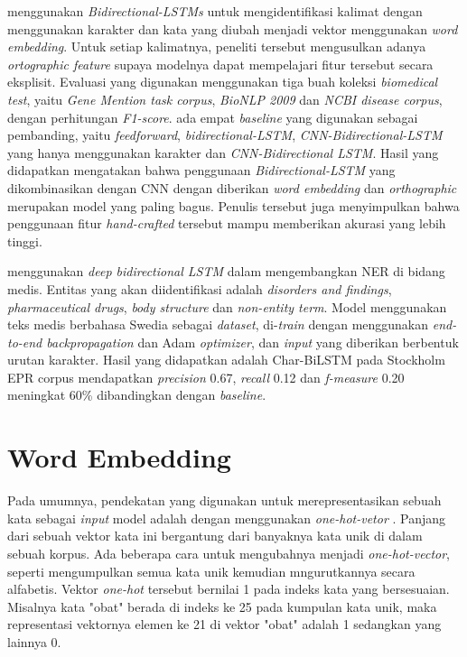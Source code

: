 \cite{limsopatham2016learning} menggunakan \textit{Bidirectional-LSTMs} untuk mengidentifikasi kalimat dengan menggunakan karakter dan kata yang diubah menjadi vektor menggunakan \textit{word embedding}. Untuk setiap kalimatnya, peneliti tersebut mengusulkan adanya \textit{ortographic feature} supaya modelnya dapat mempelajari fitur tersebut secara eksplisit. Evaluasi yang digunakan menggunakan tiga buah koleksi \textit{biomedical test}, yaitu \textit{Gene Mention task corpus}, \textit{BioNLP 2009} dan \textit{NCBI disease corpus}, dengan perhitungan \textit{F1-score}. ada empat \textit{baseline} yang digunakan sebagai pembanding, yaitu \textit{feedforward}, \textit{bidirectional-LSTM}, \textit{CNN-Bidirectional-LSTM} yang hanya menggunakan karakter dan \textit{CNN-Bidirectional LSTM}. Hasil yang didapatkan mengatakan bahwa penggunaan \textit{Bidirectional-LSTM} yang dikombinasikan dengan CNN dengan diberikan \textit{word embedding} dan \textit{orthographic} merupakan model yang paling bagus. Penulis tersebut juga menyimpulkan bahwa penggunaan fitur \textit{hand-crafted} tersebut mampu memberikan akurasi yang lebih tinggi.

\cite{almgren2016named} menggunakan \textit{deep bidirectional LSTM} dalam mengembangkan NER di bidang medis. Entitas yang akan diidentifikasi adalah \textit{disorders and findings}, \textit{pharmaceutical drugs}, \textit{body structure} dan \textit{non-entity term}. Model menggunakan teks medis berbahasa Swedia sebagai \textit{dataset}, di-\textit{train} dengan menggunakan \textit{end-to-end backpropagation} dan Adam \textit{optimizer}, dan \textit{input} yang diberikan berbentuk urutan karakter. Hasil yang didapatkan adalah Char-BiLSTM pada Stockholm EPR corpus mendapatkan \textit{precision} 0.67, \textit{recall} 0.12 dan \textit{f-measure} 0.20 meningkat 60\% dibandingkan dengan \textit{baseline}.

\section{Word Embedding}
Pada umumnya, pendekatan yang digunakan untuk merepresentasikan sebuah kata sebagai \textit{input} model adalah dengan menggunakan \textit{one-hot-vetor} \citep{turian2010word}. Panjang dari sebuah vektor kata ini bergantung dari banyaknya kata unik di dalam sebuah korpus. Ada beberapa cara untuk mengubahnya menjadi \textit{one-hot-vector}, seperti mengumpulkan semua kata unik kemudian mngurutkannya secara alfabetis. Vektor \textit{one-hot} tersebut bernilai 1 pada indeks kata yang bersesuaian. Misalnya kata "obat" berada di indeks ke 25 pada kumpulan kata unik, maka representasi vektornya elemen ke 21 di vektor "obat" adalah 1 sedangkan yang lainnya 0.

